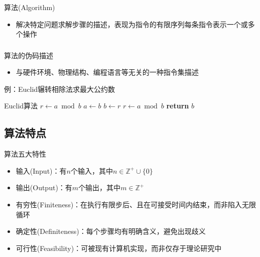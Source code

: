 \begin{frame}{\insertsubsectionhead}
    \begin{block}{算法(Algorithm)}
        \begin{itemize}
            \item 解决特定问题求解步骤的描述，表现为指令的有限序列每条指令表示一个或多个操作
        \end{itemize}
    \end{block}
\end{frame}

\begin{fragile}
    \frametitle{\insertsubsectionhead}
    \begin{block}{算法的伪码描述}
        \begin{itemize}
            \item 与硬件环境、物理结构、编程语言等无关的一种指令集描述
        \end{itemize}
    \end{block}
    \pause
    \begin{exampleblock}{例：Euclid辗转相除法求最大公约数}
        \begin{algorithmx}{Euclid算法}
            \State $r\gets a\bmod b$
            \State $a\gets b$
            \State $b\gets r$
            \State $r\gets a\bmod b$
            \EndWhile\label{euclidendwhile}
            \State \textbf{return} $b$
            \EndProcedure
        \end{algorithmx}
    \end{exampleblock}
\end{fragile}

\subsection{算法特点}

\begin{frame}{\insertsubsectionhead}
    \begin{block}{算法五大特性}
        \begin{itemize}
            \item 输入(Input)：有$n$个输入，其中$n\in\mathbb{Z}^{+}\cup\{0\}$
            \item 输出(Output)：有$m$个输出，其中$m\in\mathbb{Z}^{+}$
            \item 有穷性(Finiteness)：在执行\alert{有限步}后、且在可接受时间内结束，而非陷入无限循环
            \item 确定性(Definiteness)：每个步骤均有\alert{明确含义}，避免出现歧义
            \item 可行性(Feasibility)：可被现有计算机\alert{实现}，而非仅存于理论研究中
        \end{itemize}
    \end{block}
\end{frame}

